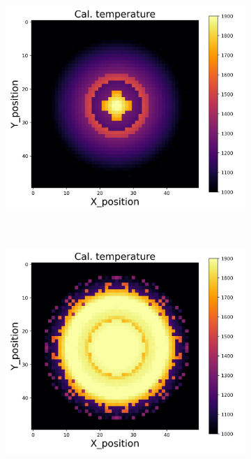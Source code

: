 {\begin{figure}[p]
\begin{minipage}{\textwidth}
\begin{subfigure}{0.325\textwidth}
        \end{subfigure}
        \begin{subfigure}{0.325\textwidth}
            \centering
            \includegraphics[width=\textwidth]{figures/raw_data/31/linear/T_cal.jpg}
        \end{subfigure}
    \end{minipage}\\
    \begin{minipage}{\textwidth}
        \centering
        \begin{subfigure}{0.325\textwidth}
            \centering
            \includegraphics[width=\textwidth]{figures/raw_data/32/linear/T_cal.jpg}

\end{subfigure}
\end{minipage}
\end{figure}}
